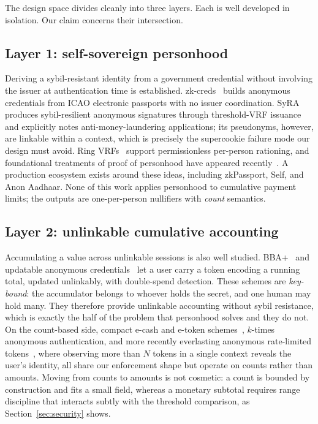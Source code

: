 \documentclass[11pt,a4paper]{article}
\theoremstyle{definition}
\theoremstyle{plain}
\theoremstyle{remark}
\begin{document}
The design space divides cleanly into three layers. Each is well developed in isolation. Our claim concerns their intersection.

\subsection{Layer 1: self-sovereign personhood}

Deriving a sybil-resistant identity from a government credential without involving the issuer at authentication time is established. zk-creds~\cite{zkcreds} builds anonymous credentials from ICAO electronic passports with no issuer coordination. SyRA~\cite{syra} produces sybil-resilient anonymous signatures through threshold-VRF issuance and explicitly notes anti-money-laundering applications; its pseudonyms, however, are linkable within a context, which is precisely the supercookie failure mode our design must avoid. Ring VRFs~\cite{ringvrf} support permissionless per-person rationing, and foundational treatments of proof of personhood have appeared recently~\cite{popfoundations}. A production ecosystem exists around these ideas, including zkPassport, Self, and Anon Aadhaar. None of this work applies personhood to cumulative payment limits; the outputs are one-per-person nullifiers with \emph{count} semantics.

\subsection{Layer 2: unlinkable cumulative accounting}

Accumulating a value across unlinkable sessions is also well studied. BBA+~\cite{bbaplus} and updatable anonymous credentials~\cite{uacs} let a user carry a token encoding a running total, updated unlinkably, with double-spend detection. These schemes are \emph{key-bound}: the accumulator belongs to whoever holds the secret, and one human may hold many. They therefore provide unlinkable accounting without sybil resistance, which is exactly the half of the problem that personhood solves and they do not. On the count-based side, compact e-cash and e-token schemes~\cite{chl2006}, $k$-times anonymous authentication, and more recently everlasting anonymous rate-limited tokens~\cite{earlt}, where observing more than $N$ tokens in a single context reveals the user's identity, all share our enforcement shape but operate on counts rather than amounts. Moving from counts to amounts is not cosmetic: a count is bounded by construction and fits a small field, whereas a monetary subtotal requires range discipline that interacts subtly with the threshold comparison, as Section~\ref{sec:security} shows.
\end{document}
